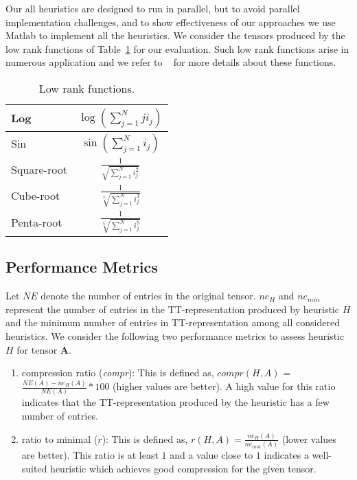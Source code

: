 \documentclass[runningheads]{llncs}
\newcommand{\tensor}[1]{\cal\textbf{#1}\xspace}
\begin{document}
Our all heuristics are designed to run in parallel, but to avoid parallel implementation challenges, and to show effectiveness of our approaches we use Matlab to implement all the heuristics. We consider the tensors produced by the low rank functions of Table~\ref{tab:lowRankFunctions} for our evaluation. Such low rank functions arise in numerous application and  we refer to ~\cite{lowRankFunctions,lowRankFunction-BM-2005,lowRankFunction-HKT-2005} for more details about these functions.

\begin{table}[htb]
	\centering
	\begin{tabular}{|l|c|}
		\hline
		Log & $\log(\sum_{j=1}^{N}j i_j)$\\ \hline
		Sin & $\sin(\sum_{j=1}^{N}i_j)$\\ \hline
		Square-root & $\frac{1}{\sqrt{\sum_{j=1}^{N}i_j^2}}$\\ \hline
		Cube-root & $\frac{1}{\sqrt[3]{\sum_{j=1}^{N}i_j^3}}$\\ \hline
		Penta-root& $\frac{1}{\sqrt[5]{\sum_{j=1}^{N}i_j^5}}$\\ \hline
	\end{tabular}
	\caption{Low rank functions.\label{tab:lowRankFunctions}}
\end{table}

\subsection{Performance Metrics}

Let $NE$ denote the number of entries in the original tensor. $ne_H$ and $ne_{min}$ represent the number of entries in the TT-representation produced by heuristic $H$ and the minimum number of entries in TT-representation among all considered heuristics. We consider the following two performance metrics to assess heuristic $H$ for tensor \tensor{A}.
\begin{enumerate}
	\item compression ratio (\textit{compr}): This is defined as, $compr(H,A)$ = $\frac{NE(A)- ne_H(A)}{NE(A)}*100$ (higher values are better). A high value for this ratio indicates that the TT-representation produced by the heuristic has a few number of entries.
	\item ratio to minimal ($r$): This is defined as, $r(H, A) = \frac{ne_H(A)}{ne_{min}(A)}$ (lower values are better). This ratio is at least $1$ and a value close to $1$ indicates a well-suited heuristic which achieves good compression for the given tensor. 
\end{enumerate}
\end{document}

